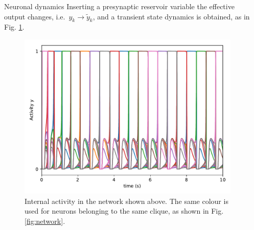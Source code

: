 \documentclass[final,hyperref={pdfpagelabels=false}]{beamer}
\begin{document}
\begin{frame}
\begin{columns}
\begin{column}{.30\textwidth}
\begin{minipage}[T]{.95\textwidth}
{\begin{block}{Neuronal dynamics}
			Inserting a presynaptic reservoir variable the effective output changes, i.e.\ $y_k \rightarrow \tilde{y}_k$, and a transient state dynamics is obtained, as in Fig. \ref{fig:activity}.
			\begin{figure}
				\includegraphics[width=.7\linewidth]{double_activity}
				\caption{Internal activity in the network shown above. The same colour is used for neurons belonging to the same clique, as shown in Fig. \ref{fig:network}.}
				\label{fig:activity}
			\end{figure}
			
			\end{block}
			
			
			
			\vfill

	 	} %
		\end{minipage}
	\end{column}
	\begin{column}{.64\textwidth}
		\begin{minipage}[T]{.95\textwidth}
		\parbox[t][\columnheight]{\textwidth}{

}
\end{minipage}
\end{column}
\end{columns}
\end{frame}
\end{document}
